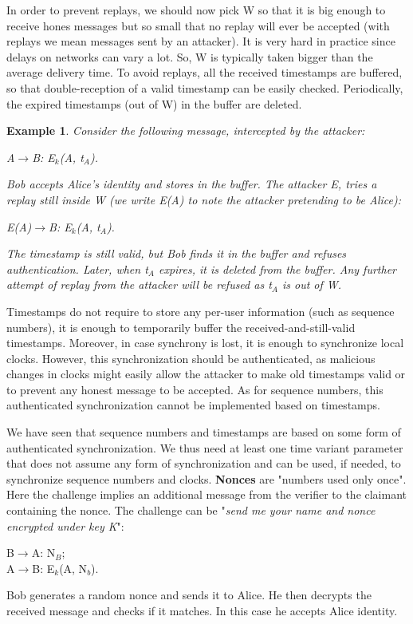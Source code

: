 \documentclass[a4paper, 12pt]{report}
\newtheorem{example}{\textbf{Example}}
\begin{document}
In order to prevent replays, we should now pick W so that it is big enough to receive hones messages but so small that no replay will ever be accepted (with replays we mean messages sent by an attacker). It is very hard in practice since delays on networks can vary a lot. So, W is typically taken bigger than the average delivery time. To avoid replays, all the received timestamps are buffered, so that double-reception of a valid timestamp can be easily checked. Periodically, the expired timestamps (out of W) in the buffer are deleted.

\begin{example}
	Consider the following message, intercepted by the attacker:
	\begin{center}
		A$\rightarrow$B: E$_k$(A, t$_A$).
	\end{center}
	Bob accepts Alice's identity and stores in the buffer. The attacker E, tries a replay still inside W (we write E(A) to note the attacker pretending to be Alice):
	\begin{center}
		E(A)$\rightarrow$B: E$_k$(A, t$_A$).
	\end{center}
	The timestamp is still valid, but Bob finds it in the buffer and refuses authentication. Later, when t$_A$ expires, it is deleted from the buffer. Any further attempt of replay from the attacker will be refused as t$_A$ is out of W. 
\end{example} 

Timestamps do not require to store any per-user information (such as sequence numbers), it is enough to temporarily buffer the received-and-still-valid timestamps. Moreover, in case synchrony is lost, it is enough to synchronize local clocks. However, this synchronization should be authenticated, as malicious changes in clocks might easily allow the attacker to make old timestamps valid or to prevent any honest message to be accepted. As for sequence numbers, this authenticated synchronization cannot be implemented based on timestamps.

We have seen that sequence numbers and timestamps are based on some form of authenticated synchronization. We thus need at least one time variant parameter that does not assume any form of synchronization and can be used, if needed, to synchronize sequence numbers and clocks. \textbf{Nonces} are "numbers used only once". Here the challenge implies an additional message from the verifier to the claimant containing the nonce. The challenge can be "\textit{send me your name and nonce encrypted under key K}":
\begin{center}
	B$\rightarrow$A: N$_B$;\\
	A$\rightarrow$B: E$_k$(A, N$_b$).
\end{center}
Bob generates a random nonce and sends it to Alice. He then decrypts the received message and checks if it matches. In this case he accepts Alice identity.
\end{document}
